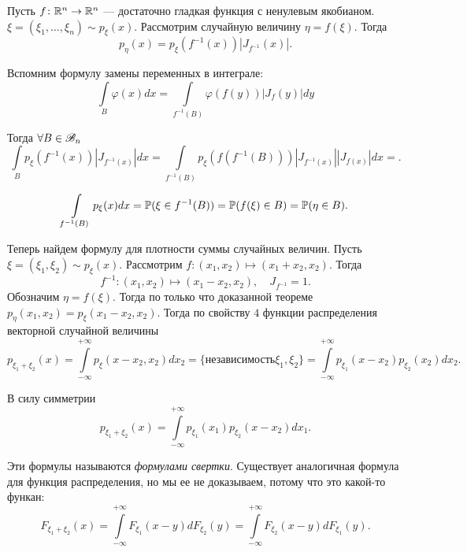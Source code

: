 \documentclass[../TV&MS.tex]{subfiles}
\begin{document}
\begin{Th}
	Пусть  $f\colon \mathbb{R}^n \to \mathbb{R}^n$ --- достаточно гладкая функция с ненулевым якобианом. 
	$\xi = (\xi_1, \ldots, \xi_n) \sim p_\xi(x)$. Рассмотрим случайную величину $\eta = f(\xi)$. 
	Тогда
	$$p_\eta(x) = p_\xi(f^{-1}(x))|J_{f^{-1}}(x)|.$$
\end{Th}

\begin{Proof}
	Вспомним формулу замены переменных в интеграле:
	$$\int\limits_B \varphi(x)dx = \int\limits_{f^{-1}(B)} \varphi(f(y))|J_f(y)|dy$$

	Тогда $\forall B \in \mathscr{B}_n$
	$$\int\limits_B p_\xi(f^{-1}(x))|J_{f^{-1}(x)}|dx = \int\limits_{f^{-1}(B)} 
	p_\xi(f(f^{-1}(B)))|J_{f^{-1}(x)}||J_{f(x)}|dx =.$$
	
	$$\int\limits_{f^{-1}(B)}p_\xi(x)dx = \mathbb{P}(\xi \in f^{-1}(B))=
	\mathbb{P}(f(\xi) \in B) = \mathbb{P}(\eta \in B).$$
\end{Proof}

	Теперь найдем формулу для плотности суммы случайных величин.
	Пусть $\xi = (\xi_1, \xi_2) \sim p_\xi(x)$. Рассмотрим $f\colon (x_1, x_2) \mapsto 
	(x_1 + x_2, x_2)$. Тогда 
	$$f^{-1} \colon (x_1, x_2) \mapsto (x_1 - x_2, x_2), \quad J_{f^{-1}}=1.$$ 
	Обозначим $\eta = f(\xi)$. Тогда по только что доказанной теореме 
	$p_\eta(x_1, x_2) = p_{\xi}(x_1 - x_2, x_2)$. Тогда по свойству $4$ функции 
	распределения векторной случайной величины
	$$p_{\xi_1 + \xi_2}(x) = \int\limits_{-\infty}^{+\infty}p_\xi(x-x_2, x_2)dx_2 = 
	\{\text{независимость}\xi_1, \xi_2\} = \int\limits_{-\infty}^{+\infty}
	p_{\xi_1}(x-x_2)p_{\xi_2}(x_2)dx_2.$$
	
	В силу симметрии 
	$$p_{\xi_1 + \xi_2}(x) = \int\limits_{-\infty}^{+\infty}p_{\xi_1}(x_1)p_{\xi_2}(x - x_2)dx_1.$$

	Эти формулы называются \emph{формулами свертки}. Существует аналогичная формула 
	для функция распределения, но мы ее не доказываем, потому что это какой-то функан:
	$$F_{\xi_1 + \xi_2}(x) = \int\limits_{-\infty}^{+\infty}F_{\xi_1}(x-y)dF_{\xi_2}(y) = 
	\int\limits_{-\infty}^{+\infty}F_{\xi_2}(x-y)dF_{\xi_1}(y).$$

\newpage
\end{document}
